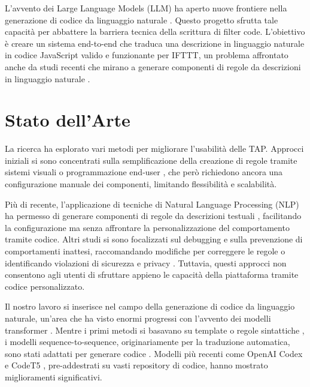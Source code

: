 \documentclass[sigconf,natbib=false]{acmart}
\begin{document}
L'avvento dei Large Language Models (LLM) ha aperto nuove frontiere nella generazione di codice da linguaggio naturale \cite{chen2021evaluating, jiang2024survey}. Questo progetto sfrutta tale capacità per abbattere la barriera tecnica della scrittura di filter code. L'obiettivo è creare un sistema end-to-end che traduca una descrizione in linguaggio naturale in codice JavaScript valido e funzionante per IFTTT, un problema affrontato anche da studi recenti che mirano a generare componenti di regole da descrizioni in linguaggio naturale \cite{gao2024chatiot, yusuf2022accurate}.

\section{Stato dell'Arte}
La ricerca ha esplorato vari metodi per migliorare l'usabilità delle TAP. Approcci iniziali si sono concentrati sulla semplificazione della creazione di regole tramite sistemi visuali \cite{corcella2019visual} o programmazione end-user \cite{krishna2021design, lieberman2006end}, che però richiedono ancora una configurazione manuale dei componenti, limitando flessibilità e scalabilità.

Più di recente, l'applicazione di tecniche di Natural Language Processing (NLP) ha permesso di generare componenti di regole da descrizioni testuali \cite{gao2024chatiot, yusuf2022recipegen}, facilitando la configurazione ma senza affrontare la personalizzazione del comportamento tramite codice. Altri studi si sono focalizzati sul debugging e sulla prevenzione di comportamenti inattesi, raccomandando modifiche per correggere le regole \cite{corno2019empowering, zhang2019autotap, zhang2023helping} o identificando violazioni di sicurezza e privacy \cite{breve2022identifying, breve2023user, breve2024hybrid}. Tuttavia, questi approcci non consentono agli utenti di sfruttare appieno le capacità della piattaforma tramite codice personalizzato.

Il nostro lavoro si inserisce nel campo della generazione di codice da linguaggio naturale, un'area che ha visto enormi progressi con l'avvento dei modelli transformer \cite{jiang2024survey}. Mentre i primi metodi si basavano su template \cite{hu2019template} o regole sintattiche \cite{bajwa2006rule}, i modelli sequence-to-sequence, originariamente per la traduzione automatica, sono stati adattati per generare codice \cite{ling2016latent, yin2017syntactic}. Modelli più recenti come OpenAI Codex \cite{chen2021evaluating} e CodeT5 \cite{wang2021codet5}, pre-addestrati su vasti repository di codice, hanno mostrato miglioramenti significativi.
\end{document}
